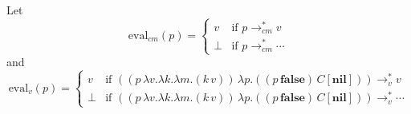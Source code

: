 \documentclass[ms,electronic,twosidetoc,letterpaper,chaptercenter,parttop]{byumsphd}
\begin{document}
Let
\[
\mathrm{eval}_{cm}(p)=\begin{cases}
v     &\text{if $p\rightarrow_{cm}^{*}v$}\\
\perp &\text{if $p\rightarrow_{cm}^{*}\cdots$}
\end{cases}
\]
and
\[
\mathrm{eval}_{v}(p)=\begin{cases}
v     &\text{if $((p\,\lambda v.\lambda k.\lambda m.(k\,v))\,\lambda p.((p\,\textbf{false})\,C[\textbf{nil}]))\rightarrow_{v}^{*}v$}\\
\perp &\text{if $((p\,\lambda v.\lambda k.\lambda m.(k\,v))\,\lambda p.((p\,\textbf{false})\,C[\textbf{nil}]))\rightarrow_{v}^{*}\cdots$}
\end{cases}
\]





\newtheorem{theorem}{Theorem}
\newtheorem{case}{Case}
\end{document}
